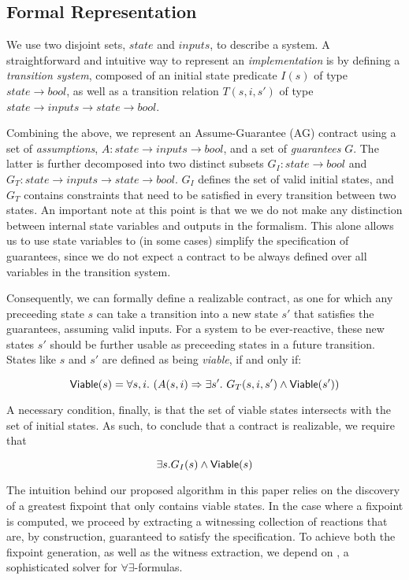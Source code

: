 \subsection{Formal Representation}
\label{sec:formals}
We use two disjoint sets, $state$ and $inputs$, to describe a system.
A straightforward and intuitive way to represent an \emph{implementation} is by
defining a \emph{transition system}, composed of an initial state
predicate $I(s)$ of type $state \to bool$, as well as a transition relation
$T(s,i,s')$ of type $state \to inputs \to state \to bool$.

Combining the above, we represent an Assume-Guarantee (AG) contract using a set
of \emph{assumptions}, $A: state \rightarrow inputs \rightarrow bool$,
and a set of \emph{guarantees} $G$. The latter is further decomposed into two
distinct subsets $G_I: state \rightarrow bool$ and $G_T: state \rightarrow
inputs \rightarrow state \rightarrow bool$. $G_I$ defines the set of valid
initial states, and $G_T$ contains constraints that need to be satisfied in
every transition between two states. An important note at this point is that we
we do not make any distinction between internal state variables and outputs in the
formalism. This alone allows us to use state variables to (in some cases)
simplify the specification of guarantees, since we do not expect a contract
to be always defined over all variables in the transition system.

Consequently, we can formally define a realizable contract, as one for which any
preceeding state $s$ can take a transition into a new state $s'$ that satisfies
the guarantees, assuming valid inputs. For a system to be ever-reactive, these
new states $s'$ should be further usable as preceeding states in a future
transition. States like $s$ and $s'$ are defined as being \textit{viable}, if
and only if:

\begin{equation}
{\mathsf {Viable}}(s) = \forall s,i. \ (A(s, i) \Rightarrow \exists s'.~ G_T(s, i,s')
\land {\mathsf {Viable}}(s'))
\label{eq:viable}
\end{equation}

A necessary condition, finally, is that the set of viable states
intersects with the set of initial states. As such, to conclude that a contract
is realizable, we require that

\begin{equation}
\exists s. G_I(s) \land {\mathsf {Viable}}(s)
\label{eq:nonempty}
\end{equation}

The intuition behind our proposed algorithm in this paper relies on the
discovery of a greatest fixpoint that only contains viable states. In the case where a fixpoint is computed, we proceed by extracting a witnessing collection of reactions that are, by construction, guaranteed to satisfy the specification. To achieve both the fixpoint generation, as well as the witness extraction, we depend on \aeval, a sophisticated solver for $\forall\exists$-formulas.


